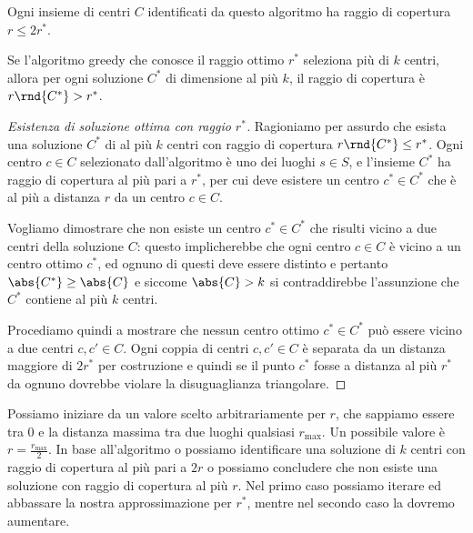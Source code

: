 \documentclass[\main/main.tex]{subfiles}
\begin{document}
\begin{multicols}{2}
\begin{observation}
    Ogni insieme di centri \(C\) identificati da questo algoritmo ha raggio di copertura \(r \leq 2r^*\).
\end{observation}
\vfill\null
\columnbreak
\begin{lemma}
    Se l'algoritmo greedy che conosce il raggio ottimo \(r^*\) seleziona più di \(k\) centri, allora per ogni soluzione \(C^*\) di dimensione al più \(k\), il raggio di copertura è \(r\rnd{C^*} > r^*\).
\end{lemma}
\begin{proof}[Esistenza di soluzione ottima con raggio \(r^*\)]
    Ragioniamo per assurdo che esista una soluzione \(C^*\) di al più \(k\) centri con raggio di copertura \(r\rnd{C^*} \leq r^*\). Ogni centro \(c \in C\) selezionato dall'algoritmo è uno dei luoghi \(s \in S\), e l'insieme \(C^*\) ha raggio di copertura al più pari a \(r^*\), per cui deve esistere un centro \(c^* \in C^*\) che è al più a distanza \(r\) da un centro \(c \in C\).
    
    Vogliamo dimostrare che non esiste un centro \(c^* \in C^*\) che risulti vicino a due centri della soluzione \(C\): questo implicherebbe che ogni centro \(c \in C\) è vicino a un centro ottimo \(c^*\), ed ognuno di questi deve essere distinto e pertanto \(\abs{C^*} \geq \abs{C}\) e siccome \(\abs{C} > k\) si contraddirebbe l'assunzione che \(C^*\) contiene al più \(k\) centri.
    
    Procediamo quindi a mostrare che nessun centro ottimo \(c^* \in C^*\) può essere vicino a due centri \(c, c' \in C\). Ogni coppia di centri  \(c, c' \in C\) è separata da un distanza maggiore di \(2r^*\) per costruzione e quindi se il punto \(c^*\) fosse a distanza al più \(r^*\) da ognuno dovrebbe violare la disuguaglianza triangolare.
\end{proof}
\begin{observation}
    Possiamo iniziare da un valore scelto arbitrariamente per \(r\), che sappiamo essere tra \(0\) e la distanza massima tra due luoghi qualsiasi \(r_{\text{max}}\). Un possibile valore è \(r=\frac{r_{\text{max}}}{2}\). In base all'algoritmo o possiamo identificare una soluzione di \(k\) centri con raggio di copertura al più pari a \(2r\) o possiamo concludere che non esiste una soluzione con raggio di copertura al più \(r\). Nel primo caso possiamo iterare ed abbassare la nostra approssimazione per \(r^*\), mentre nel secondo caso la dovremo aumentare.
    

\end{observation}
\end{multicols}
\end{document}
